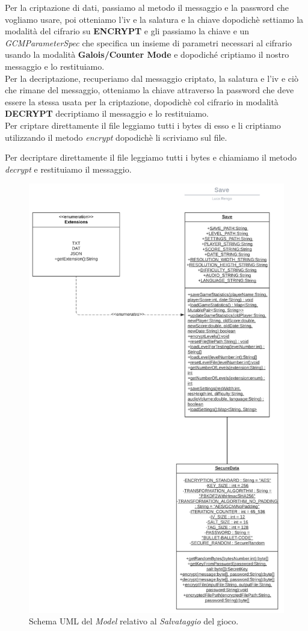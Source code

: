 \textsf{\small Per la criptazione di dati, passiamo al metodo il messaggio e la password che vogliamo usare, poi otteniamo l'iv e la salatura e la chiave dopodichè settiamo la modalità del cifrario su \textbf{ENCRYPT} e gli passiamo la chiave e un \emph{GCMParameterSpec} che specifica un insieme di parametri necessari al cifrario usando la modalità \textbf{Galois/Counter Mode} e dopodiché criptiamo il nostro messaggio e lo restituiamo.} \\

\textsf{\small Per la decriptazione, recuperiamo dal messaggio criptato, la salatura e l'iv e ciò che rimane del messaggio, otteniamo la chiave attraverso la password che deve essere la stessa usata per la criptazione, dopodichè col cifrario in modalità \textbf{DECRYPT} decriptiamo il messaggio e lo restituiamo.} \\

\textsf{\small Per criptare direttamente il file leggiamo tutti i bytes di esso e li criptiamo utilizzando il metodo \emph{encrypt} dopodichè li scriviamo sul file.} 

\textsf{\small Per decriptare direttamente il file leggiamo tutti i bytes e chiamiamo il metodo \emph{decrypt} e restituiamo il messaggio.} \\

\begin{figure}[H]
	\centering{}
	\includegraphics[width=.5\textwidth]{./img/save_uml.png} 
	\caption{Schema UML del \emph{Model} relativo al \emph{Salvataggio} del gioco.}
	\label{img:save_uml}
\end{figure}

